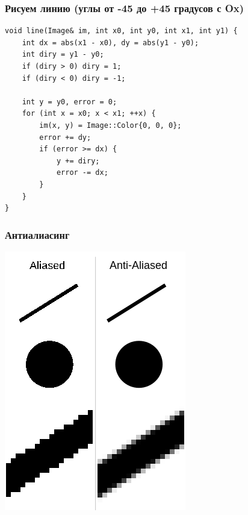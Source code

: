 \documentclass[10pt,pdf,hyperref={unicode}]{beamer}
\begin{document}
\begin{frame}[fragile]
\frametitle{Рисуем линию (углы от -45 до +45 градусов с Ox)} 
\begin{lstlisting}
void line(Image& im, int x0, int y0, int x1, int y1) {
    int dx = abs(x1 - x0), dy = abs(y1 - y0);
    int diry = y1 - y0;
    if (diry > 0) diry = 1; 
    if (diry < 0) diry = -1;

    int y = y0, error = 0;
    for (int x = x0; x < x1; ++x) {
        im(x, y) = Image::Color{0, 0, 0};
        error += dy;
        if (error >= dx) {
            y += diry;
            error -= dx;
        }
    }
}
\end{lstlisting}
\end{frame}


\begin{frame}[fragile]
\frametitle{Антиалиасинг} 
\begin{center}
\includegraphics[scale=0.4]{./images/anti-aliasing.png}
\end{center}
\end{frame}
\end{document}
